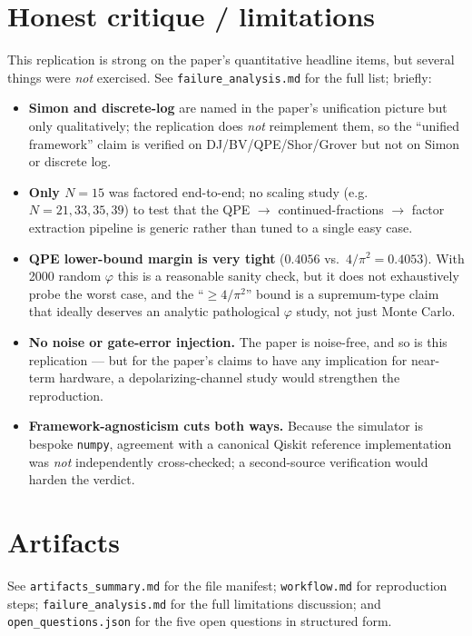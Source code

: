 \documentclass[11pt]{article}
\begin{document}
\section{Honest critique / limitations}
This replication is strong on the paper's quantitative headline items, but
several things were \emph{not} exercised. See
\texttt{failure\_analysis.md} for the full list; briefly:
\begin{itemize}
    \item \textbf{Simon and discrete-log} are named in the paper's unification
          picture but only qualitatively; the replication does \emph{not}
          reimplement them, so the ``unified framework'' claim is verified
          on DJ/BV/QPE/Shor/Grover but not on Simon or discrete log.
    \item \textbf{Only $N=15$} was factored end-to-end; no scaling study
          (e.g.\ $N=21,33,35,39$) to test that the QPE $\to$ continued-fractions
          $\to$ factor extraction pipeline is generic rather than tuned to a
          single easy case.
    \item \textbf{QPE lower-bound margin is very tight} ($0.4056$ vs.\
          $4/\pi^{2}{=}0.4053$). With 2000 random $\varphi$ this is a
          reasonable sanity check, but it does not exhaustively probe the
          worst case, and the ``$\ge 4/\pi^{2}$'' bound is a supremum-type
          claim that ideally deserves an analytic pathological $\varphi$
          study, not just Monte Carlo.
    \item \textbf{No noise or gate-error injection.} The paper is
          noise-free, and so is this replication --- but for the paper's
          claims to have any implication for near-term hardware, a
          depolarizing-channel study would strengthen the reproduction.
    \item \textbf{Framework-agnosticism cuts both ways.} Because the
          simulator is bespoke \texttt{numpy}, agreement with a canonical
          Qiskit reference implementation was \emph{not} independently
          cross-checked; a second-source verification would harden the
          verdict.
\end{itemize}



\section{Artifacts}
See \texttt{artifacts\_summary.md} for the file manifest;
\texttt{workflow.md} for reproduction steps;
\texttt{failure\_analysis.md} for the full limitations discussion; and
\texttt{open\_questions.json} for the five open questions in structured form.
\end{document}
